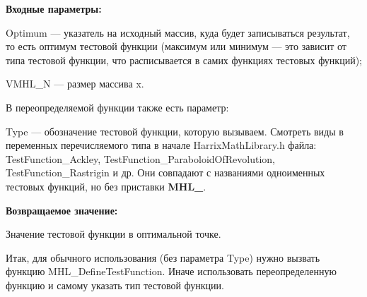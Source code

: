 \textbf{Входные параметры:}

Optimum --- указатель на исходный массив, куда будет записываться результат, то есть оптимум тестовой функции (максимум или минимум --- это зависит от типа тестовой функции, что расписывается в самих функциях тестовых функций);

     VMHL\_N --- размер массива x.

В переопределяемой функции также есть параметр:
  
Type --- обозначение тестовой функции, которую вызываем.
Смотреть виды в переменных перечисляемого типа в начале HarrixMathLibrary.h файла: TestFunction\_Ackley, TestFunction\_ParaboloidOfRevolution, TestFunction\_Rastrigin и др. Они совпадают с названиями одноименных тестовых функций, но без приставки \textbf{MHL\_}.

\textbf{Возвращаемое значение:}
 
Значение тестовой функции в оптимальной точке.

Итак, для обычного использования (без параметра Type) нужно вызвать функцию MHL\_DefineTestFunction. Иначе использовать переопределенную функцию и самому указать тип тестовой функции.